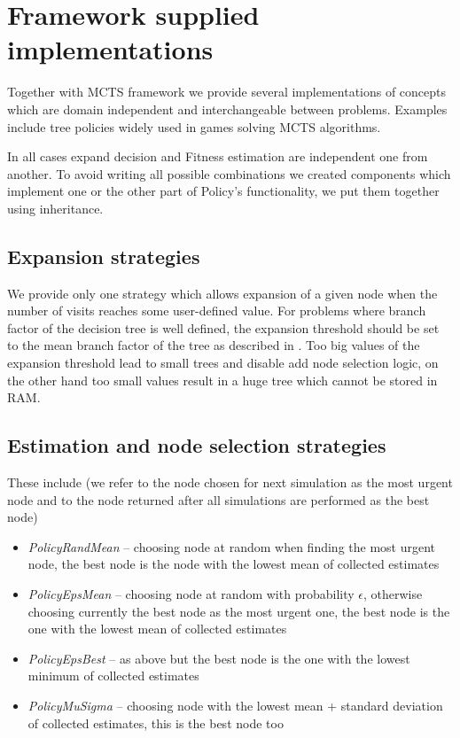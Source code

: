 \section{Framework supplied implementations}

Together with MCTS framework we provide several implementations of concepts
which are domain independent and interchangeable between problems. Examples
include tree policies widely used in games solving MCTS algorithms.

In all cases expand decision and Fitness estimation are independent one from
another. To avoid writing all possible combinations we created components which
implement one or the other part of Policy's functionality, we put them together
using inheritance.

\subsection{Expansion strategies}

We provide only one strategy which allows expansion of a given node when the
number of visits reaches some user-defined value. For problems where branch
factor of the decision tree is well defined, the expansion threshold should be
set to the mean branch factor of the tree as described in \cite{Pawlewicz}.
Too big values of the expansion threshold lead to small trees and disable add
node selection logic, on the other hand too small values result in a huge tree
which cannot be stored in RAM.

\subsection{Estimation and node selection strategies}

These include (we refer to the node chosen for next simulation as the most
urgent node and to the node returned after all simulations are performed as the
best node)
\begin{itemize}
  \item \emph{PolicyRandMean} -- choosing node at random when finding the most
    urgent node, the best node is the node with the lowest mean of collected
    estimates
  \item \emph{PolicyEpsMean} -- choosing node at random with probability
    $\epsilon$, otherwise choosing currently the best node as the most urgent
    one, the best node is the one with the lowest mean of collected estimates
  \item \emph{PolicyEpsBest} -- as above but the best node is the one with the
    lowest minimum of collected estimates
  \item \emph{PolicyMuSigma} -- choosing node with the lowest mean + standard
    deviation of collected estimates, this is the best node too
\end{itemize}

